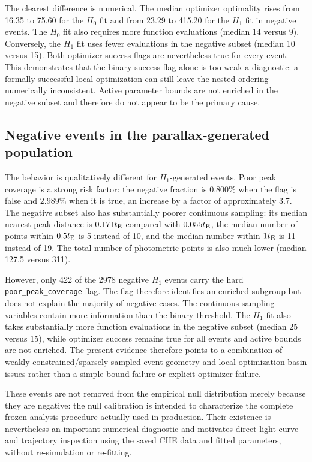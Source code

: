 \documentclass[11pt,a4paper]{article}
\newcommand{\te}{t_{\rm E}}
\newcommand{\Hnull}{H_0}
\newcommand{\Halt}{H_1}
\begin{document}
The clearest difference is numerical. The median optimizer optimality rises from 16.35 to
75.60 for the $\Hnull$ fit and from 23.29 to 415.20 for the $\Halt$ fit in negative events.
The $\Hnull$ fit also requires more function evaluations (median 14 versus 9). Conversely, the
$\Halt$ fit uses fewer evaluations in the negative subset (median 10 versus 15). Both optimizer
success flags are nevertheless true for every event. This demonstrates that the binary success
flag alone is too weak a diagnostic: a formally successful local optimization can still leave
the nested ordering numerically inconsistent. Active parameter bounds are not enriched in the
negative subset and therefore do not appear to be the primary cause.

\subsection{Negative events in the parallax-generated population}

The behavior is qualitatively different for $\Halt$-generated events. Poor peak coverage is a
strong risk factor: the negative fraction is $0.800\%$ when the flag is false and $2.989\%$
when it is true, an increase by a factor of approximately 3.7. The negative subset also has
substantially poorer continuous sampling: its median nearest-peak distance is $0.171\te$
compared with $0.055\te$, the median number of points within $0.5\te$ is 5 instead of 10, and
the median number within $1\te$ is 11 instead of 19. The total number of photometric points is
also much lower (median 127.5 versus 311).

However, only 422 of the 2978 negative $\Halt$ events carry the hard
\texttt{poor\_peak\_coverage} flag. The flag therefore identifies an enriched subgroup but does
not explain the majority of negative cases. The continuous sampling variables contain more
information than the binary threshold. The $\Halt$ fit also takes substantially more function
evaluations in the negative subset (median 25 versus 15), while optimizer success remains true
for all events and active bounds are not enriched. The present evidence therefore points to a
combination of weakly constrained/sparsely sampled event geometry and local optimization-basin
issues rather than a simple bound failure or explicit optimizer failure.

These events are not removed from the empirical null distribution merely because they are
negative: the null calibration is intended to characterize the complete frozen analysis
procedure actually used in production. Their existence is nevertheless an important numerical
diagnostic and motivates direct light-curve and trajectory inspection using the saved CHE data
and fitted parameters, without re-simulation or re-fitting.
\end{document}

